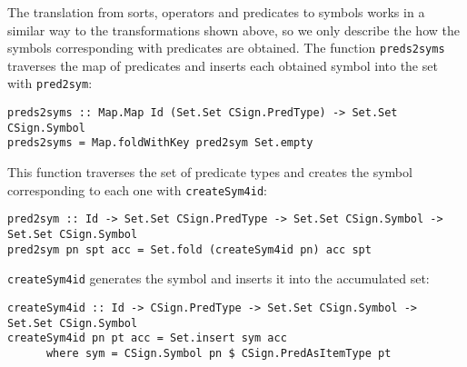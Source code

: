 The translation from sorts, operators and predicates to symbols
works in a similar
way to the transformations shown above, so we only describe the 
how the symbols corresponding with predicates are obtained. The function
\verb"preds2syms" traverses the map of predicates and inserts each
obtained symbol into the set with \verb"pred2sym":

{\codesize
\begin{verbatim}
preds2syms :: Map.Map Id (Set.Set CSign.PredType) -> Set.Set CSign.Symbol
preds2syms = Map.foldWithKey pred2sym Set.empty
\end{verbatim}
}

This function traverses the set of predicate types and creates the
symbol corresponding to each one with \verb"createSym4id":

{\codesize
\begin{verbatim}
pred2sym :: Id -> Set.Set CSign.PredType -> Set.Set CSign.Symbol -> Set.Set CSign.Symbol
pred2sym pn spt acc = Set.fold (createSym4id pn) acc spt
\end{verbatim}
}

\verb"createSym4id" generates the symbol and inserts it into the
accumulated set:

{\codesize
\begin{verbatim}
createSym4id :: Id -> CSign.PredType -> Set.Set CSign.Symbol -> Set.Set CSign.Symbol
createSym4id pn pt acc = Set.insert sym acc
      where sym = CSign.Symbol pn $ CSign.PredAsItemType pt
\end{verbatim}
}





















